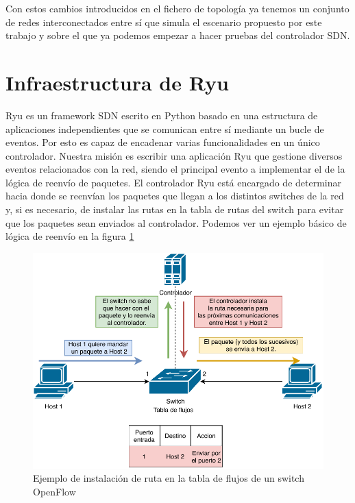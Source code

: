 Con estos cambios introducidos en el fichero de topología ya tenemos un conjunto de redes interconectados entre sí que simula el escenario propuesto por este trabajo y sobre el que ya podemos empezar a hacer pruebas del controlador SDN.


\section{Infraestructura de Ryu}

Ryu es un framework SDN escrito en Python basado en una estructura de aplicaciones independientes que se comunican entre sí mediante un bucle de eventos. Por esto es capaz de encadenar varias funcionalidades en un único controlador. Nuestra misión es escribir una aplicación Ryu que gestione diversos eventos relacionados con la red, siendo el principal evento a implementar el de la lógica de reenvío de paquetes. El controlador Ryu está encargado de determinar hacia donde se reenvían los paquetes que llegan a los distintos switches de la red y, si es necesario, de instalar las rutas en la tabla de rutas del switch para evitar que los paquetes sean enviados al controlador. Podemos ver un ejemplo básico de lógica de reenvío en la figura \ref{fig:primerpaquete}

\begin{figure}[!h]
    \centering
    \includegraphics[width=\textwidth]{imagenes/figuras/primerpaquete.pdf}
    \caption{Ejemplo de instalación de ruta en la tabla de flujos de un switch OpenFlow}
    \label{fig:primerpaquete}
\end{figure}

